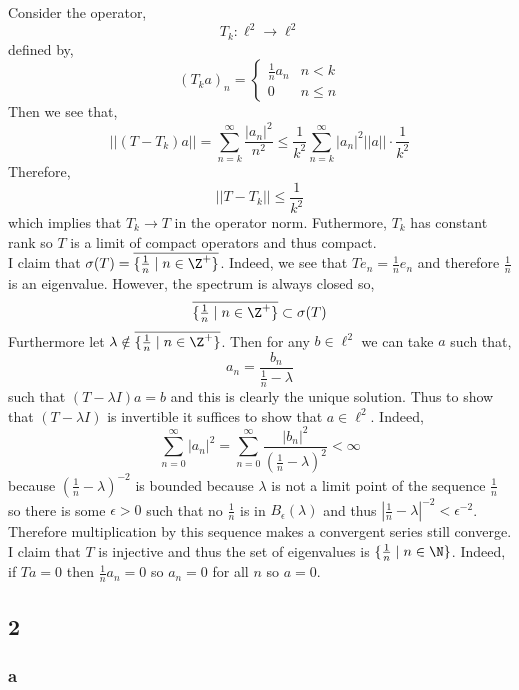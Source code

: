 \documentclass[12pt]{article}
\begin{document}
Consider the operator,
\[ T_k : \ell^2 \to \ell^2 \]
defined by,
\[ (T_k a)_n 
= \begin{cases}
\tfrac{1}{n} a_n & n < k 
\\
0 & n \le n
\end{cases} \]
Then we see that,
\[ || (T - T_k) a || = \sum_{n = k}^{\infty} \frac{|a_n|^2}{n^2} \le \frac{1}{k^2} \sum_{n = k}^\infty |a_n|^2 || a || \cdot \frac{1}{k^2} \]
Therefore,
\[ || T - T_k || \le \frac{1}{k^2} \]
which implies that $T_k \to T$ in the operator norm. Futhermore, $T_k$ has constant rank so $T$ is a limit of compact operators and thus compact.
\bigskip\\
I claim that $\sigma(T) = \overline{\{ \frac{1}{n} \mid n \in \Z^{+} \}}$. Indeed, we see that $T e_n = \frac{1}{n} e_n$ and therefore $\frac{1}{n}$ is an eigenvalue. However, the spectrum is always closed so,
\[ \overline{\{ \tfrac{1}{n} \mid n \in \Z^{+} \}} \subset \sigma(T) \]
Furthermore let $\lambda \notin \overline{\{ \frac{1}{n} \mid n \in \Z^{+} \}}$. Then for any $b \in \ell^2$ we can take $a$ such that,
\[ a_n = \frac{b_n}{\frac{1}{n} - \lambda} \]
such that $(T - \lambda I) a = b$ and this is clearly the unique solution. Thus to show that $(T - \lambda I)$ is invertible it suffices to show that $a \in \ell^2$. Indeed,
\[ \sum_{n = 0}^\infty | a_n |^2 = \sum_{n = 0}^\infty \frac{|b_n|^2}{(\frac{1}{n} - \lambda)^2} < \infty \]
because $(\frac{1}{n} - \lambda)^{-2}$ is bounded because $\lambda$ is not a limit point of the sequence $\frac{1}{n}$ so there is some $\epsilon > 0$ such that no $\frac{1}{n}$ is in $B_\epsilon(\lambda)$ and thus $|\frac{1}{n} - \lambda|^{-2} < \epsilon^{-2}$. Therefore multiplication by this sequence makes a convergent series still converge.
\bigskip\\
I claim that $T$ is injective and thus the set of eigenvalues is $\{ \frac{1}{n} \mid n \in \N \}$. Indeed, if $T a = 0$ then $\frac{1}{n} a_n = 0$ so $a_n = 0$ for all $n$ so $a = 0$. 

\subsection{2}

\subsubsection{a}

\newcommand{\diam}{\mathrm{diam}}
\end{document}
